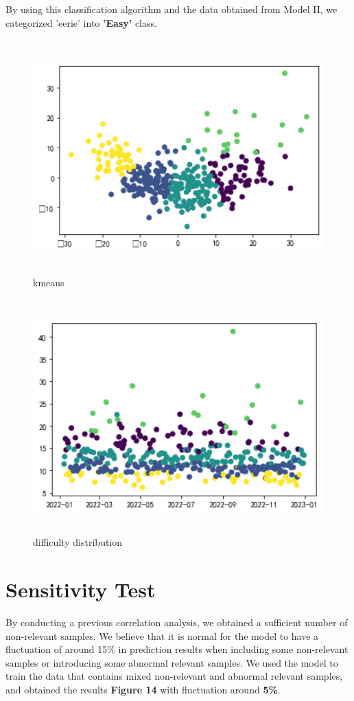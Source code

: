 \documentclass[12pt]{article}
\begin{document}
By using this classification algorithm and the data obtained from Model II, we categorized 'eerie' into \textbf{'Easy'} class.

\begin{figure}
	
	\centering
	
	\includegraphics[height=9cm, width=13cm]{kmeans.png}
	\caption{kmeans}
\end{figure}
	
\begin{figure}[htbp]
	
	\centering
	\includegraphics[height=9cm, width=13cm]{difficult.png}
	\caption{difficulty distribution}
	
\end{figure}

\newpage{}
\section{Sensitivity Test}
By conducting a previous correlation analysis, we obtained a sufficient number of non-relevant samples. We believe that it is normal for the model to have a fluctuation of around 15\% in prediction results when including some non-relevant samples or introducing some abnormal relevant samples. We used the model to train the data that contains mixed non-relevant and abnormal relevant samples, and obtained the results \textbf{Figure 14} with fluctuation around \textbf{5\%}. 
\end{document}
